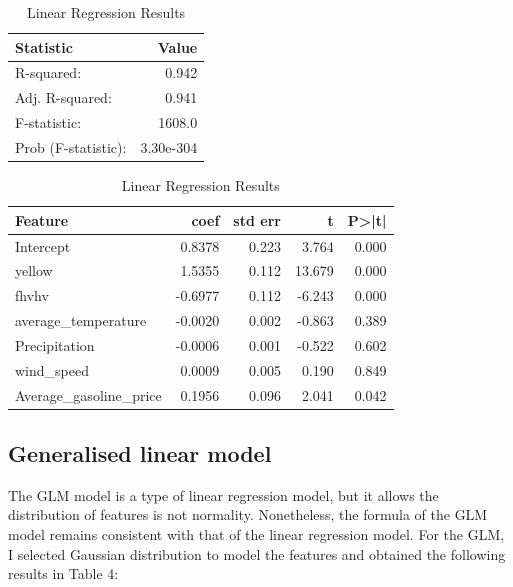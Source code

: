 \documentclass[11pt]{article}
\begin{document}
\begin{table}[ht]
    \centering
    \begin{tabular}{l r} 
    \hline
    \textbf{Statistic} & \textbf{Value} \\
    \hline
    R-squared: & 0.942 \\
    Adj. R-squared: & 0.941 \\
    F-statistic: & 1608.0 \\
    Prob (F-statistic): & 3.30e-304 \\
    \hline
    \end{tabular}
    \vspace{0.5cm}  
    \begin{tabular}{l r r r r}  
    \hline
    \textbf{Feature} & \textbf{coef} & \textbf{std err} & \textbf{t} & \textbf{P>|t|} \\
    \hline
    Intercept & 0.8378 & 0.223 & 3.764 & 0.000 \\
    yellow & 1.5355 & 0.112 & 13.679 & 0.000 \\
    fhvhv & -0.6977 & 0.112 & -6.243 & 0.000 \\
    average\_temperature & -0.0020 & 0.002 & -0.863 & 0.389 \\
    Precipitation & -0.0006 & 0.001 & -0.522 & 0.602 \\
    wind\_speed & 0.0009 & 0.005 & 0.190 & 0.849 \\
    Average\_gasoline\_price & 0.1956 & 0.096 & 2.041 & 0.042 \\
    \hline
    \end{tabular}
    \caption{Linear Regression Results}
    \label{tab:linear_regression_results}
    \end{table}

\subsection{Generalised linear model}

The GLM model is a type of linear regression model, but it allows the distribution of features is not normality. Nonetheless, the formula of the GLM model remains 
consistent with that of the linear regression model. For the GLM, I selected Gaussian distribution to model the features and obtained the following results in Table 4:
\end{document}
